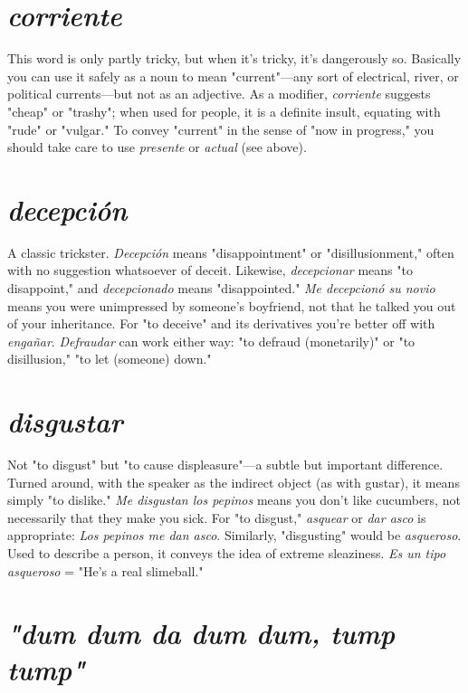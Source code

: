 \documentclass[14pt,a4paper,oneside]{memoir}
\begin{document}
\section{\emph{corriente}}

This word is only partly tricky, but when it's
tricky, it's dangerously so. Basically you can use it safely as a noun to
mean "current"---any sort of electrical, river, or political currents---but not as an adjective. As a modifier, \emph{corriente} suggests "cheap" or
"trashy"; when used for people, it is a definite insult, equating with
"rude" or "vulgar." To convey "current" in the sense of "now in progress," you should take care to use \emph{presente} or \emph{actual} (see above).

\section{\emph{decepción}}

A classic trickster. \emph{Decepción} means "disappointment" or "disillusionment," often with no suggestion whatsoever
of deceit. Likewise, \emph{decepcionar} means "to disappoint," and \emph{decepcionado} means "disappointed." \emph{Me decepcionó su novio} means you
were unimpressed by someone's boyfriend, not that he talked you out
of your inheritance. For "to deceive" and its derivatives you're better
off with \emph{engañar}. \emph{Defraudar} can work either way: "to defraud (monetarily)" or "to disillusion," "to let (someone) down."

\section{\emph{disgustar}}

Not "to disgust" but "to cause displeasure"---a
subtle but important difference. Turned around, with the speaker as
the indirect object (as with gustar), it means simply "to dislike." \emph{Me
disgustan los pepinos} means you don't like cucumbers, not necessarily
that they make you sick. For "to disgust," \emph{asquear} or \emph{dar asco} is appropriate: \emph{Los pepinos me dan asco}. Similarly, "disgusting" would be
\emph{asqueroso}. Used to describe a person, it conveys the idea of extreme
sleaziness. \emph{Es un tipo asqueroso} = "He's a real slimeball."

\section{\emph{"dum dum da dum dum, tump tump"}}
\end{document}
